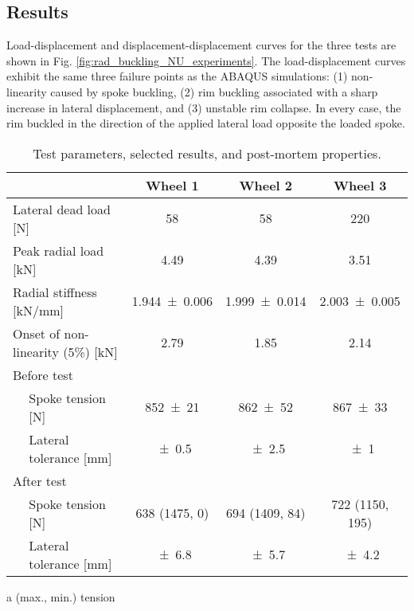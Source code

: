 \documentclass[\rootdir/thesis.tex]{subfiles}
\begin{document}
\subsection{Results}

Load-displacement and displacement-displacement curves for the three tests are shown in Fig. \ref{fig:rad_buckling_NU_experiments}. The load-displacement curves exhibit the same three failure points as the ABAQUS simulations: (1) non-linearity caused by spoke buckling, (2) rim buckling associated with a sharp increase in lateral displacement, and (3) unstable rim collapse. In every case, the rim buckled in the direction of the applied lateral load opposite the loaded spoke.

\begin{table}
\begin{threeparttable}
\caption[Radial buckling experimental results]{Test parameters, selected results, and post-mortem properties.}
\label{tab:rad_buckling_tests}
\begin{tabular}{llccc}
\toprule
&& \bf Wheel 1 & \bf Wheel 2 & \bf Wheel 3\\
\midrule
\multicolumn{2}{l}{Lateral dead load [\si{N}]} & \num{58} & \num{58} & \num{220}\\
\multicolumn{2}{l}{Peak radial load [\si{kN}]} & \num{4.49} & \num{4.39} & \num{3.51}\\
\multicolumn{2}{l}{Radial stiffness [\si{kN/mm}]} & \num{1.944+-0.006} & \num{1.999+-0.014} & \num{2.003+-0.005}\\
\multicolumn{2}{l}{Onset of non-linearity (5\%) [\si{kN}]} & \num{2.79} & \num{1.85} & \num{2.14}\\
\multicolumn{5}{l}{Before test}\\
\,& Spoke tension [\si{N}]      & \num{852+-21} & \num{862+-52} & \num{867+-33}\\
\,& Lateral tolerance [\si{mm}] & \num{+-0.5} & \num{+-2.5} & \num{+-1}\\

\multicolumn{5}{l}{After test}\\
\,& Spoke tension [\si{N}]      & 638 (1475, 0)\tnote{a} & 694 (1409, 84) & 722 (1150, 195)\\
\,& Lateral tolerance [\si{mm}] & \num{+-6.8} & \num{+-5.7} & \num{+-4.2}\\
\bottomrule
\end{tabular}
\begin{tablenotes}
\small
\item [a] (max., min.) tension
\end{tablenotes}
\end{threeparttable}
\end{table}
\end{document}
